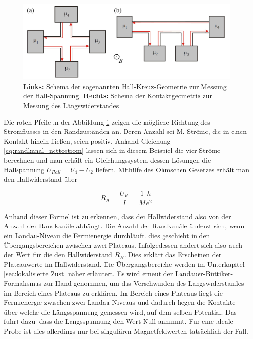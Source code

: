 \begin{figure}[h]
\centering
\includegraphics[width=0.7\linewidth]{images/Anleitungsheft/Vierpunktmessung_Anleitungsheft}
\caption[fig:vierpunktmessung]{\textbf{Links:} Schema der sogenannten Hall-Kreuz-Geometrie zur Messung der Hall-Spannung. \textbf{Rechts:} Schema der Kontaktgeometrie zur Messung des Längswiderstandes}
\label{fig:Vierpunktmessung_Anleitungsheft}
\end{figure}

Die roten Pfeile in der Abbildung \ref{fig:Vierpunktmessung_Anleitungsheft} zeigen die mögliche Richtung des Stromflusses in den Randzuständen an. Deren Anzahl sei M. Ströme, die in einen Kontakt hinein fließen, seien positiv. 
Anhand Gleichung \ref{eq:randkanal_nettostrom} lassen sich in diesem Beispiel die vier Ströme berechnen und man erhält ein Gleichungssystem dessen Lösungen die Hallspannung $U_{Hall}=U_4-U_2$ liefern. 
Mithilfe des Ohmschen Gesetzes erhält man den Hallwiderstand über

\begin{equation}
R_H=\frac{U_H}{I}=\frac{1}{M}\frac{h}{e^2}
\label{eq:U_Hall_simpel}
\end{equation}

Anhand dieser Formel ist zu erkennen, dass der Hallwiderstand also von der Anzahl der Randkanäle abhängt. Die Anzahl der Randkanäle änderst sich, wenn ein Landau-Niveau die Fermienergie durchläuft. dies geschieht in den Übergangsbereichen zwischen zwei Plateaus. Infolgedessen ändert sich also auch der Wert für die den Hallwiderstand $R_H$. Dies erklärt das Erscheinen der Plateauwerte im Hallwiderstand. Die Übergangsbereiche werden im Unterkapitel \ref{sec:lokalisierte Zust} näher erläutert. 
Es wird erneut der Landauer-Büttiker-Formalismus zur Hand genommen, um das Verschwinden des Längswiderstandes im Bereich eines Plateaus zu erklären. Im Bereich eines Plateaus liegt die Fermienergie zwischen zwei Landau-Niveaus und dadurch liegen die Kontakte über welche die Längsspannung gemessen wird, auf dem selben Potential. Das führt dazu, dass die Längsspannung den Wert Null annimmt. Für eine ideale Probe ist dies allerdings nur bei singulären Magnetfeldwerten tatsächlich der Fall.



